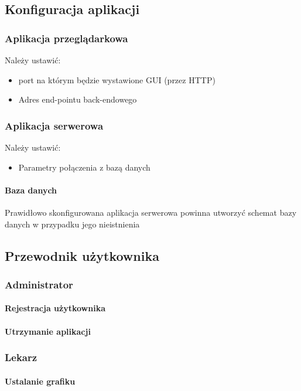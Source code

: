 \documentclass[polish,12pt]{aghthesis}
\begin{document}
\subsection{Konfiguracja aplikacji}
\subsubsection{Aplikacja przeglądarkowa}{Należy ustawić:
\begin{itemize}
    \item port na którym będzie wystawione GUI (przez HTTP)
    \item Adres end-pointu back-endowego
\end{itemize}}
\subsubsection{Aplikacja serwerowa}{Należy ustawić:
\begin{itemize}
    \item Parametry połączenia z bazą danych
\end{itemize}}
\paragraph{Baza danych}{Prawidłowo skonfigurowana aplikacja serwerowa powinna utworzyć schemat bazy danych w przypadku jego nieistnienia}


\subsection{Przewodnik użytkownika}
\subsubsection{Administrator}
\paragraph{Rejestracja użytkownika}{}
\paragraph{Utrzymanie aplikacji}{}
\subsubsection{Lekarz}
\paragraph{Ustalanie grafiku}{}
\end{document}
